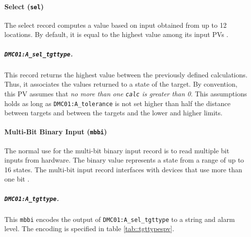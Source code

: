 \paragraph{Select (\texttt{sel})}
    The select record computes a value based on input obtained from up to 12 locations.
    By default, it is equal to the highest value among its input PVs \cite{stanley1998}.

    \subparagraph{\texttt{DMC01:A\_sel\_tgttype}.}
        This record returns the highest value between the previously defined calculations.
        Thus, it associates the values returned to a state of the target.
        By convention, this PV assumes that \emph{no more than one \texttt{calc} is greater than 0}.
        This assumptions holds as long as \texttt{DMC01:A\_tolerance} is not set higher than half the distance between targets and between the targets and the lower and higher limits.

\paragraph{Multi-Bit Binary Input (\texttt{mbbi})}
    The normal use for the multi-bit binary input record is to read multiple bit inputs from hardware.
    The binary value represents a state from a range of up to 16 states.
    The multi-bit input record interfaces with devices that use more than one bit \cite{stanley1998}.

    \subparagraph{\texttt{DMC01:A\_tgttype}.}
        This \texttt{mbbi} encodes the output of \texttt{DMC01:A\_sel\_tgttype} to a string and alarm level.
        The encoding is specified in table \ref{tab::tgttypespv}.

